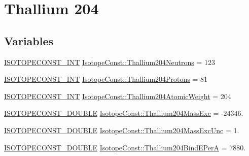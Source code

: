 \hypertarget{group___isotope_const-_thallium-_tl204}{}\section{Thallium 204}
\label{group___isotope_const-_thallium-_tl204}
\subsection*{Variables}
\begin{DoxyCompactItemize}
\item 
\mbox{\hyperlink{group___isotope_const-_macros_ga5f18360b3e99483a35c32d789e62621c}{I\+S\+O\+T\+O\+P\+E\+C\+O\+N\+S\+T\+\_\+\+I\+NT}} \mbox{\hyperlink{group___isotope_const-_thallium-_tl204_gaa15aa7bd512397d9e3656131146967ed}{Isotope\+Const\+::\+Thallium204\+Neutrons}} = 123
\item 
\mbox{\hyperlink{group___isotope_const-_macros_ga5f18360b3e99483a35c32d789e62621c}{I\+S\+O\+T\+O\+P\+E\+C\+O\+N\+S\+T\+\_\+\+I\+NT}} \mbox{\hyperlink{group___isotope_const-_thallium-_tl204_gad28616567c6cb729d0551e1f9f0ea79f}{Isotope\+Const\+::\+Thallium204\+Protons}} = 81
\item 
\mbox{\hyperlink{group___isotope_const-_macros_ga5f18360b3e99483a35c32d789e62621c}{I\+S\+O\+T\+O\+P\+E\+C\+O\+N\+S\+T\+\_\+\+I\+NT}} \mbox{\hyperlink{group___isotope_const-_thallium-_tl204_gafe7535e51f3bd8afb775a5137766660d}{Isotope\+Const\+::\+Thallium204\+Atomic\+Weight}} = 204
\item 
\mbox{\hyperlink{group___isotope_const-_macros_ga8f45a7272ce02c0b4c65c44636ed719a}{I\+S\+O\+T\+O\+P\+E\+C\+O\+N\+S\+T\+\_\+\+D\+O\+U\+B\+LE}} \mbox{\hyperlink{group___isotope_const-_thallium-_tl204_gab0e55ef28d89b6cdaa55c86e30b58311}{Isotope\+Const\+::\+Thallium204\+Mass\+Exc}} = -\/24346.
\item 
\mbox{\hyperlink{group___isotope_const-_macros_ga8f45a7272ce02c0b4c65c44636ed719a}{I\+S\+O\+T\+O\+P\+E\+C\+O\+N\+S\+T\+\_\+\+D\+O\+U\+B\+LE}} \mbox{\hyperlink{group___isotope_const-_thallium-_tl204_gafdc85b40120d0b321594facd74a702ad}{Isotope\+Const\+::\+Thallium204\+Mass\+Exc\+Unc}} = 1.
\item 
\mbox{\hyperlink{group___isotope_const-_macros_ga8f45a7272ce02c0b4c65c44636ed719a}{I\+S\+O\+T\+O\+P\+E\+C\+O\+N\+S\+T\+\_\+\+D\+O\+U\+B\+LE}} \mbox{\hyperlink{group___isotope_const-_thallium-_tl204_ga84ee72be2b9ab4c1556cfea0077c0e99}{Isotope\+Const\+::\+Thallium204\+Bind\+E\+PerA}} = 7880.
\item 

\end{DoxyCompactItemize}
